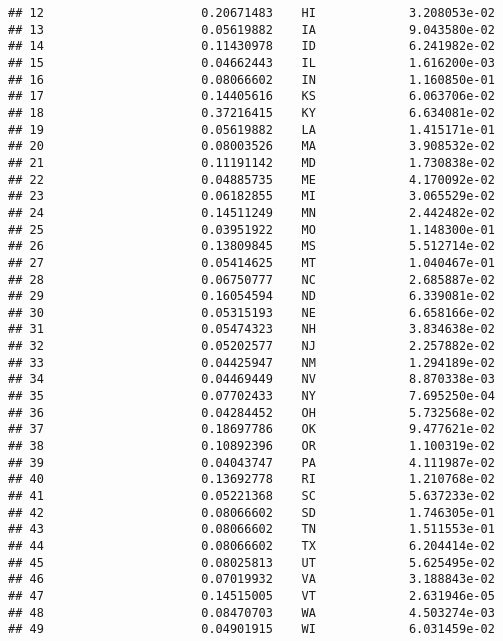 \documentclass{article}\usepackage[]{graphicx}\usepackage[]{color}
\makeatletter
\newenvironment{kframe}{%
 \def\at@end@of@kframe{}%
 \ifinner\ifhmode%
  \def\at@end@of@kframe{\end{minipage}}%
  \begin{minipage}{\columnwidth}%
 \fi\fi%
 \def\FrameCommand##1{\hskip\@totalleftmargin \hskip-\fboxsep
 \colorbox{shadecolor}{##1}\hskip-\fboxsep
     \hskip-\linewidth \hskip-\@totalleftmargin \hskip\columnwidth}%
 \MakeFramed {\advance\hsize-\width
   \@totalleftmargin\z@ \linewidth\hsize
   \@setminipage}}%
 {\par\unskip\endMakeFramed%
 \at@end@of@kframe}
\newenvironment{knitrout}{}{} %
\makeatother
\begin{document}
\begin{knitrout}
\begin{kframe}
\begin{verbatim}
## 12                      0.20671483    HI             3.208053e-02
## 13                      0.05619882    IA             9.043580e-02
## 14                      0.11430978    ID             6.241982e-02
## 15                      0.04662443    IL             1.616200e-03
## 16                      0.08066602    IN             1.160850e-01
## 17                      0.14405616    KS             6.063706e-02
## 18                      0.37216415    KY             6.634081e-02
## 19                      0.05619882    LA             1.415171e-01
## 20                      0.08003526    MA             3.908532e-02
## 21                      0.11191142    MD             1.730838e-02
## 22                      0.04885735    ME             4.170092e-02
## 23                      0.06182855    MI             3.065529e-02
## 24                      0.14511249    MN             2.442482e-02
## 25                      0.03951922    MO             1.148300e-01
## 26                      0.13809845    MS             5.512714e-02
## 27                      0.05414625    MT             1.040467e-01
## 28                      0.06750777    NC             2.685887e-02
## 29                      0.16054594    ND             6.339081e-02
## 30                      0.05315193    NE             6.658166e-02
## 31                      0.05474323    NH             3.834638e-02
## 32                      0.05202577    NJ             2.257882e-02
## 33                      0.04425947    NM             1.294189e-02
## 34                      0.04469449    NV             8.870338e-03
## 35                      0.07702433    NY             7.695250e-04
## 36                      0.04284452    OH             5.732568e-02
## 37                      0.18697786    OK             9.477621e-02
## 38                      0.10892396    OR             1.100319e-02
## 39                      0.04043747    PA             4.111987e-02
## 40                      0.13692778    RI             1.210768e-02
## 41                      0.05221368    SC             5.637233e-02
## 42                      0.08066602    SD             1.746305e-01
## 43                      0.08066602    TN             1.511553e-01
## 44                      0.08066602    TX             6.204414e-02
## 45                      0.08025813    UT             5.625495e-02
## 46                      0.07019932    VA             3.188843e-02
## 47                      0.14515005    VT             2.631946e-05
## 48                      0.08470703    WA             4.503274e-03
## 49                      0.04901915    WI             6.031459e-02

\end{verbatim}
\end{kframe}
\end{knitrout}
\end{document}
